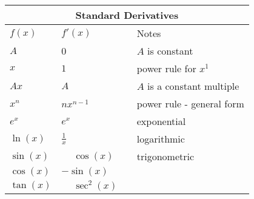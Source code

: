 \begin{center}
	\renewcommand{\arraystretch}{1.2}
		\begin{tabular}{llll}
			\multicolumn{4}{c}{Standard Derivatives}\\\midrule
			$f(x)$ & $f'(x)$  &&Notes\\ \midrule
			$A$&0&&$A$ is constant\\ 
			$x$&$1$&&power rule for $x^1$\\ 
			$Ax$&$A$&&$A$ is a constant multiple\\ \midrule
			$x^n$ & $nx^{n-1}$ &&power rule - general form\\ 
			$e^x$ & $e^x$  && exponential\\ 
			$\ln(x)$ & $\frac{1}{x}$ &&logarithmic\\ \midrule
			$\sin(x)$ & $\phantom{-}\cos(x)$  &&trigonometric \\ 
			$\cos(x)$ & $-\sin(x)$ && \\ 
			$\tan(x)$ & $\phantom{-}\sec^2(x)$ && \\ \bottomrule
		\end{tabular}
	\end{center}
